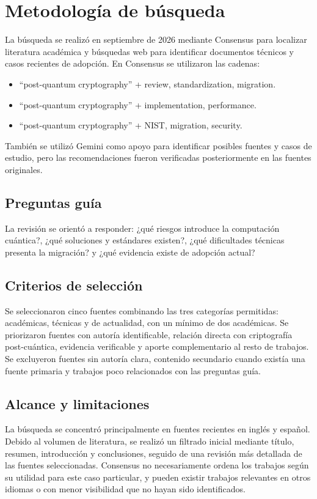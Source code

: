 \section{Metodología de búsqueda}
\label{sec:metodologia}

La búsqueda se realizó en septiembre de 2026 mediante Consensus para localizar literatura académica y búsquedas web para identificar documentos técnicos y casos recientes de adopción. En Consensus se utilizaron las cadenas:

\begin{itemize}
    \item ``post-quantum cryptography'' + review, standardization, migration.
    \item ``post-quantum cryptography'' + implementation, performance.
    \item ``post-quantum cryptography'' + NIST, migration, security.
\end{itemize}

También se utilizó Gemini como apoyo para identificar posibles fuentes y casos de estudio, pero las recomendaciones fueron verificadas posteriormente en las fuentes originales.

\subsection{Preguntas guía}

La revisión se orientó a responder: ¿qué riesgos introduce la computación cuántica?, ¿qué soluciones y estándares existen?, ¿qué dificultades técnicas presenta la migración? y ¿qué evidencia existe de adopción actual?

\subsection{Criterios de selección}

Se seleccionaron cinco fuentes combinando las tres categorías permitidas: académicas, técnicas y de actualidad, con un mínimo de dos académicas. Se priorizaron fuentes con autoría identificable, relación directa con criptografía post-cuántica, evidencia verificable y aporte complementario al resto de trabajos. Se excluyeron fuentes sin autoría clara, contenido secundario cuando existía una fuente primaria y trabajos poco relacionados con las preguntas guía.

\subsection{Alcance y limitaciones}

La búsqueda se concentró principalmente en fuentes recientes en inglés y español. Debido al volumen de literatura, se realizó un filtrado inicial mediante título, resumen, introducción y conclusiones, seguido de una revisión más detallada de las fuentes seleccionadas. Consensus no necesariamente ordena los trabajos según su utilidad para este caso particular, y pueden existir trabajos relevantes en otros idiomas o con menor visibilidad que no hayan sido identificados.